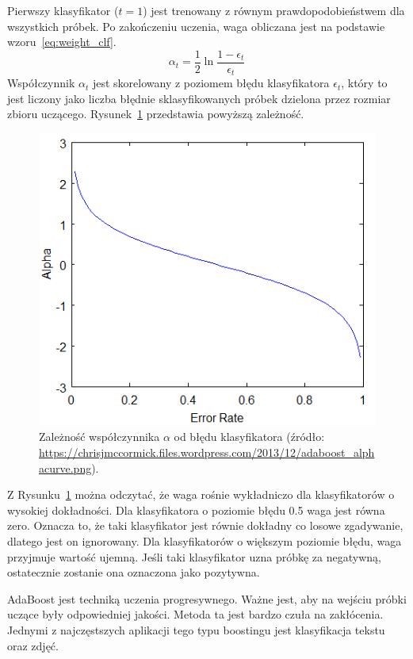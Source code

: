Pierwszy klasyfikator ($t=1$) jest trenowany z równym prawdopodobieństwem dla wszystkich próbek.
Po zakończeniu uczenia, waga obliczana jest na podstawie wzoru~\eqref{eq:weight_clf}.
\begin{equation}
    \label{eq:weight_clf}
    \alpha_t = \dfrac{1}{2} \ln \dfrac{1-\epsilon_t}{\epsilon_t}
\end{equation}
Współczynnik $\alpha_t$ jest skorelowany z poziomem błędu klasyfikatora $\epsilon_t$, który to jest liczony jako liczba błędnie sklasyfikowanych próbek dzielona przez rozmiar zbioru uczącego.
Rysunek~\ref{fig:adaboost_alphacurve} przedstawia powyższą zależność.
\begin{figure}[!ht]
    \centering
    \includegraphics[scale=0.6]{Pictures/adaboost_alphacurve}
    \caption{Zależność współczynnika $\alpha$ od błędu klasyfikatora (źródło: \url{https://chrisjmccormick.files.wordpress.com/2013/12/adaboost_alphacurve.png}).}
    \label{fig:adaboost_alphacurve}
\end{figure}
\FloatBarrier
Z Rysunku~\ref{fig:adaboost_alphacurve} można odczytać, że waga rośnie wykładniczo dla klasyfikatorów o wysokiej dokładności.
Dla klasyfikatora o poziomie błędu 0.5 waga jest równa zero.
Oznacza to, że taki klasyfikator jest równie dokładny co losowe zgadywanie, dlatego jest on ignorowany.
Dla klasyfikatorów o większym poziomie błędu, waga przyjmuje wartość ujemną.
Jeśli taki klasyfikator uzna próbkę za negatywną, ostatecznie zostanie ona oznaczona jako pozytywna.

AdaBoost jest techniką uczenia progresywnego.
Ważne jest, aby na wejściu próbki uczące były odpowiedniej jakości.
Metoda ta jest bardzo czuła na zakłócenia.
Jednymi z najczęstszych aplikacji tego typu boostingu jest klasyfikacja tekstu oraz zdjęć.

